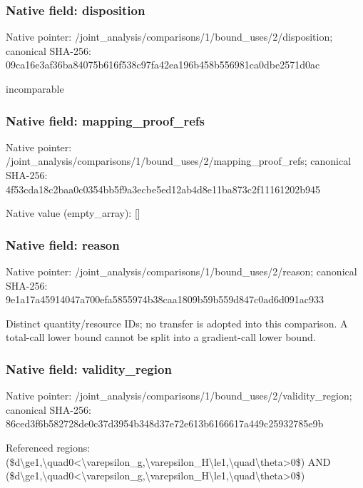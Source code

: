 \documentclass[10pt,a4paper]{article}
\begin{document}
\subsubsection{Native field: disposition}
Native pointer: /joint\_\allowbreak{}analysis/comparisons/1/bound\_\allowbreak{}uses/2/disposition; canonical SHA-256: 09ca16e3af36ba84075b616f538c97fa42ea196b458b556981ca0dbe2571d0ac

\begingroup\raggedright\sloppy incomparable\par\endgroup

\subsubsection{Native field: mapping\_\allowbreak{}proof\_\allowbreak{}refs}
Native pointer: /joint\_\allowbreak{}analysis/comparisons/1/bound\_\allowbreak{}uses/2/mapping\_\allowbreak{}proof\_\allowbreak{}refs; canonical SHA-256: 4f53cda18c2baa0c0354bb5f9a3ecbe5ed12ab4d8e11ba873c2f11161202b945

Native value (empty\_\allowbreak{}array): []

\subsubsection{Native field: reason}
Native pointer: /joint\_\allowbreak{}analysis/comparisons/1/bound\_\allowbreak{}uses/2/reason; canonical SHA-256: 9e1a17a45914047a700efa5855974b38caa1809b59b559d847c0ad6d091ac933

\begingroup\raggedright\sloppy Distinct quantity/\allowbreak{}resource IDs;\allowbreak{} no transfer is adopted into this comparison. A total-call lower bound cannot be split into a gradient-call lower bound.\par\endgroup

\subsubsection{Native field: validity\_\allowbreak{}region}
Native pointer: /joint\_\allowbreak{}analysis/comparisons/1/bound\_\allowbreak{}uses/2/validity\_\allowbreak{}region; canonical SHA-256: 86ced3f6b582728de0c37d3954b348d37e72e613b6166617a449c25932785e9b

\begingroup\raggedright\sloppy Referenced regions:\allowbreak{} (\$d\textbackslash{}ge1,\allowbreak{}\textbackslash{}quad0<\textbackslash{}varepsilon\_\allowbreak{}g,\allowbreak{}\textbackslash{}varepsilon\_\allowbreak{}H\textbackslash{}le1,\allowbreak{}\textbackslash{}quad\textbackslash{}theta>0\$) AND (\$d\textbackslash{}ge1,\allowbreak{}\textbackslash{}quad0<\textbackslash{}varepsilon\_\allowbreak{}g,\allowbreak{}\textbackslash{}varepsilon\_\allowbreak{}H\textbackslash{}le1,\allowbreak{}\textbackslash{}quad\textbackslash{}theta>0\$)\par\endgroup
\end{document}
